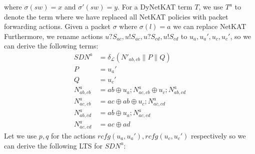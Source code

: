 \begin{example}
    where $\sigma(sw) = x$ and $\sigma'(sw) = y$.
    For a DyNetKAT term $T$, we use $T^a$ to denote the term where
    we have replaced all NetKAT policies with packet forwarding actions.
    Given a packet $\sigma$ where $\sigma(l) = a$ we can replace NetKAT
    Furthermore, we rename actions
    $u?S_{ac},u!S_{ac},u?S_{cd},u!S_{cd}$ to $u_a,u_a',u_c,u_c'$,
    so we can derive the following terms:
    \begin{align*}
        SDN^a       & = \delta_{\mathcal{L}}
        ( N'_{ab,cb} \parallel P \parallel Q)               \\
        P           & = u_a'                                \\
        Q           & = u_c'                                \\
        N^a_{ab,cb} & = ab \oplus u_a;N^a_{ac,cb}
        \oplus u_c;N^a_{ab,cd}                              \\
        N^a_{ac,cb} & = ac \oplus ab \oplus u_c;N^a_{ac,cd} \\
        N^a_{ab,cd} & = ab \oplus u_a;N^a_{ac,cd}           \\
        N^a_{ac,cd} & = ac \oplus ad
    \end{align*}
    Let we use $p,q$ for the actions $rcfg(u_a,u_a'),rcfg(u_c,u_c')$
    respectively so we can derive the following LTS for $SDN^u$:
    \begin{center}
\end{center}
\end{example}

